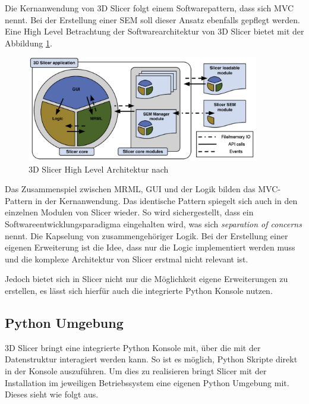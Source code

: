 Die Kernanwendung von 3D Slicer folgt einem Softwarepattern, dass sich \ac{MVC} nennt.
Bei der Erstellung einer \ac{SEM} soll dieser Ansatz ebenfalls gepflegt werden.
Eine High Level Betrachtung der Softwarearchitektur von 3D Slicer bietet
\cite[Seite 1332]{fedorov2012slicer} mit der Abbildung
\ref{fig:3d_slicer_architektur}.

\begin{figure}[h]
	\centering
	\includegraphics[width=0.9\textwidth]{img/3d_slicer_architektur.jpg}
	\caption{3D Slicer High Level Architektur nach \citet[Seite 1326]{fedorov2012slicer}}
	\label{fig:3d_slicer_architektur}
\end{figure}

Das Zusammenspiel zwischen \ac{MRML}, \ac{GUI} und der Logik bilden das MVC-Pattern
in der Kernanwendung. Das identische Pattern spiegelt sich auch in den einzelnen
Modulen von Slicer wieder. So wird sichergestellt, dass ein Softwareentwicklungsparadigma
eingehalten wird, was sich \textit{separation of concerns} nennt. Die Kapselung
von zusammengehöriger Logik. Bei der Erstellung einer eigenen Erweiterung ist die
Idee, dass nur die Logic implementiert werden muss und die komplexe Architektur
von Slicer erstmal nicht relevant ist.

Jedoch bietet sich in Slicer nicht nur die Möglichkeit eigene Erweiterungen zu
erstellen, es lässt sich hierfür auch die integrierte Python Konsole nutzen.

\subsection{Python Umgebung}
\label{subsec:pythob_umgebung} 3D Slicer bringt eine integrierte Python Konsole mit,
über die mit der Datenstruktur interagiert werden kann. So ist es möglich,
Python Skripte direkt in der Konsole auszuführen. Um dies zu realisieren bringt Slicer
mit der Installation im jeweiligen Betriebssystem eine eigenen Python Umgebung mit.
Dieses sieht wie folgt aus.

